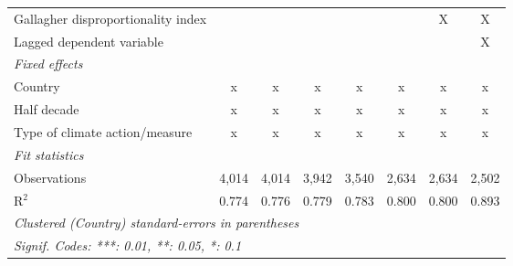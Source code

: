 \begin{tabular}{lccccccc}
   Gallagher disproportionality index                               &               &              &               &         &               & X             & X\\  
   Lagged dependent variable                                        &               &              &               &         &               &               & X\\  
   \emph{Fixed effects}\\
   Country                                                          & x             & x            & x             & x       & x             & x             & x\\  
   Half decade                                                      & x             & x            & x             & x       & x             & x             & x\\  
   Type of climate action/measure                                   & x             & x            & x             & x       & x             & x             & x\\  
   \midrule \emph{Fit statistics}\\
   Observations                                                     & 4,014         & 4,014        & 3,942         & 3,540   & 2,634         & 2,634         & 2,502\\  
   R$^2$                                                            & 0.774         & 0.776        & 0.779         & 0.783   & 0.800         & 0.800         & 0.893\\  
   \midrule
   \multicolumn{8}{l}{\emph{Clustered (Country) standard-errors in parentheses}}\\
   \multicolumn{8}{l}{\emph{Signif. Codes: ***: 0.01, **: 0.05, *: 0.1}}\\
\end{tabular}
\par\endgroup


